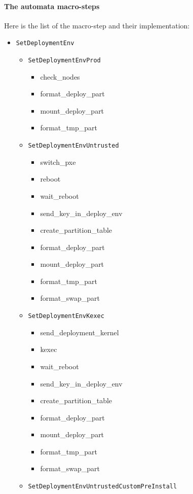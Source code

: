 \documentclass[a4wide,10pt,oneside]{book}
\begin{document}
\paragraph{The automata macro-steps\\}
Here is the list of the macro-step and their implementation:
\begin{itemize}
\item \texttt{SetDeploymentEnv}
  \begin{itemize}
  \item \texttt{SetDeploymentEnvProd}
    \begin{itemize}
    \item check\_nodes
    \item format\_deploy\_part
    \item mount\_deploy\_part
    \item format\_tmp\_part
    \end{itemize}
  \item \texttt{SetDeploymentEnvUntrusted}
    \begin{itemize}
    \item switch\_pxe
    \item reboot
    \item wait\_reboot
    \item send\_key\_in\_deploy\_env
    \item create\_partition\_table
    \item format\_deploy\_part
    \item mount\_deploy\_part
    \item format\_tmp\_part
    \item format\_swap\_part
    \end{itemize}
  \item \texttt{SetDeploymentEnvKexec}
    \begin{itemize}
    \item send\_deployment\_kernel
    \item kexec
    \item wait\_reboot
    \item send\_key\_in\_deploy\_env
    \item create\_partition\_table
    \item format\_deploy\_part
    \item mount\_deploy\_part
    \item format\_tmp\_part
    \item format\_swap\_part
    \end{itemize}
  \item \texttt{SetDeploymentEnvUntrustedCustomPreInstall}

\end{itemize}
\end{itemize}
\end{document}
